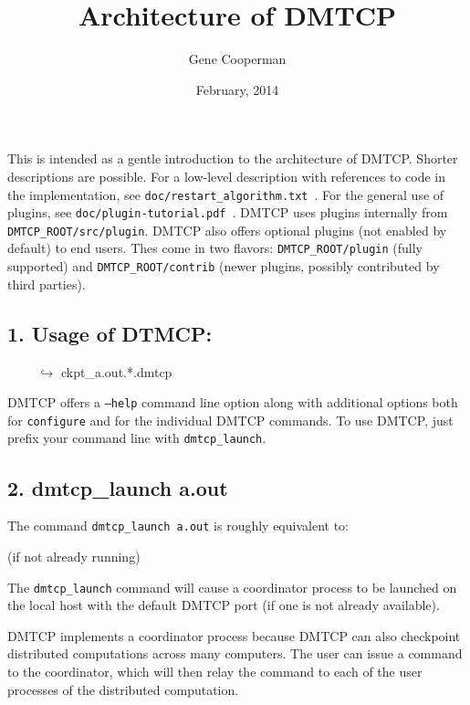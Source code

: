 \documentclass{article}
\title{Architecture of DMTCP}
\author{Gene Cooperman}
\date{February, 2014}
\begin{document}
\maketitle

This is intended as a gentle introduction to the architecture of DMTCP.
Shorter descriptions are possible.  For a low-level description with
references to code in the implementation, see
{\tt doc/restart\_algorithm.txt}~.  For the general use of plugins,
see {\tt doc/plugin-tutorial.pdf}~.  DMTCP uses plugins internally
from {\tt DMTCP\_ROOT/src/plugin}.  DMTCP also offers optional plugins
(not enabled by default) to end users.  Thes come in two flavors:
{\tt DMTCP\_ROOT/plugin}
(fully supported) and {\tt DMTCP\_ROOT/contrib} (newer plugins,
possibly contributed by third parties).

\subsection*{1. Usage of DTMCP:}
\begin{algorithmic}[1]
 \newline
\hbox{\ \ \ \ } $\hookrightarrow$ ckpt\_a.out.*.dmtcp
\end{algorithmic}

\bigskip
\noindent
DMTCP offers a {\tt --help} command line option along with additional options
both for {\tt configure} and for the individual DMTCP commands.
To use DMTCP, just prefix your command line with {\tt dmtcp\_launch}.

\subsection*{2. dmtcp\_launch a.out}

The command {\tt dmtcp\_launch a.out} is roughly equivalent to:

\begin{algorithmic}[1]
  (if not already running)
\end{algorithmic}

The {\tt dmtcp\_launch} command will cause a coordinator process
to be launched on the local host with the default DMTCP port (if one is
not already available).

DMTCP implements a coordinator process because DMTCP can also checkpoint
distributed computations across many computers.  The user can issue a command
to the coordinator, which will then relay the command to each of
the user processes of the distributed computation.
\end{document}
